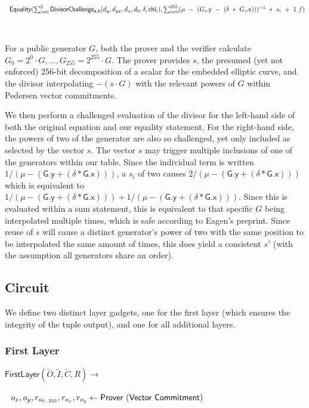 \documentclass[]{article}
\begin{document}
$~~\mathsf{Equality}(\sum^2_{i=0} \mathsf{DivisorChallenge_{a,b}}(d_y, d_{yx}, d_x, d_0, \delta, \mathsf{chl}_i), \sum^{255}_{i=0} (\mu ~-~ (G_i\mathsf{.y} ~-~ (\delta ~*~ G_i\mathsf{.x})))^{-1} ~*~ s_i ~+~ 1 ~f)$

\

For a public generator $G$, both the prover and the verifier calculate $G_0 = 2^0 \cdot G, ..., G_{255} = 2^{255} \cdot G$. The prover provides $s$, the presumed (yet not enforced) 256-bit decomposition of a scalar for the embedded elliptic curve, and the divisor interpolating $-(s \cdot G)$ with the relevant powers of $G$ within Pedersen vector commitments.

We then perform a challenged evaluation of the divisor for the left-hand side of both the original equation and our equality statement. For the right-hand side, the powers of two of the generator are also so challenged, yet only included as selected by the vector $s$. The vector $s$ may trigger multiple inclusions of one of the generators within our table. Since the individual term is written $1 / (\mu - (\mathsf{G.y} + (\delta * \mathsf{G.x})))$, a $s_i$ of two causes $2 / (\mu - (\mathsf{G.y} + (\delta * \mathsf{G.x})))$ which is equivalent to $1 / (\mu - (\mathsf{G.y} + (\delta * \mathsf{G.x}))) + 1 / (\mu - (\mathsf{G.y} + (\delta * \mathsf{G.x})))$. Since this is evaluated within a sum statement, this is equivalent to that specific $G$ being interpolated multiple times, which is safe according to Eagen's preprint. Since reuse of $s$ will cause a distinct generator's power of two with the same position to be interpolated the same amount of times, this does yield a consistent $s'$ (with the assumption all generators share an order).

\newpage

\subsection{Circuit}

We define two distinct layer gadgets, one for the first layer (which ensures the integrity of the tuple output), and one for all additional layers.

\subsubsection{First Layer}

$\mathsf{FirstLayer}(\tilde{O}, \tilde{I}, \tilde{C}, R) \rightarrow$

$~~o_x, o_y, r_{o_{0..255}}, r_{o_x}, r_{o_y}\leftarrow \mathsf{Prover ~(Vector ~Commitment)}$
\end{document}
